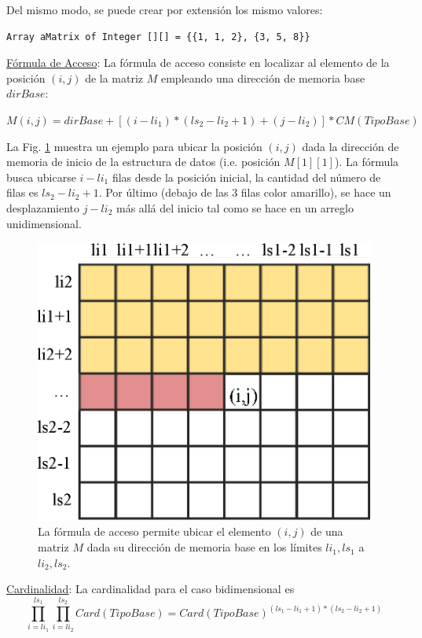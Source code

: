 Del mismo modo, se puede crear por extensión los mismo valores:

\begin{lstlisting}[upquote=true, language=pseudo]
Array aMatrix of Integer [][] = {{1, 1, 2}, {3, 5, 8}}
\end{lstlisting}

\underline{Fórmula de Acceso}: La fórmula de acceso consiste en localizar al elemento de la posición $(i,j)$ de la matriz $M$ empleando una dirección de memoria base $dirBase$:

$M(i,j) = dirBase + [(i - li_1)*(ls_2 - li_2 + 1) + (j - li_2)] * CM(TipoBase)$

La Fig. \ref{fig:matrix} muestra un ejemplo para ubicar la posición $(i,j)$ dada la dirección de memoria de inicio de la estructura de datos (i.e. posición $M[1][1]$). La fórmula busca ubicarse $i - li_1$ filas desde la posición inicial, la cantidad del número de filas es $ls_2 - li_2 + 1$. Por último (debajo de las 3 filas color amarillo), se hace un desplazamiento $j - li_2$ más allá del inicio tal como se hace en un arreglo unidimensional.

\begin{figure}[!htb]
\centering
\includegraphics[scale=.7]{images/matriz.eps}
\caption{La fórmula de acceso permite ubicar el elemento $(i,j)$ de una matriz $M$ dada su dirección de memoria base en los límites $li_1,ls_1$ a $li_2,ls_2$.}
\label{fig:matrix}
\end{figure}

\underline{Cardinalidad}: La cardinalidad para el caso bidimensional es $$\prod_{i=li_1}^{ls_1}{\prod_{i=li_2}^{ls_2}{Card(TipoBase)}} = Card(TipoBase)^{(ls_1-li_1+1)*(ls_2-li_2+1)}$$

